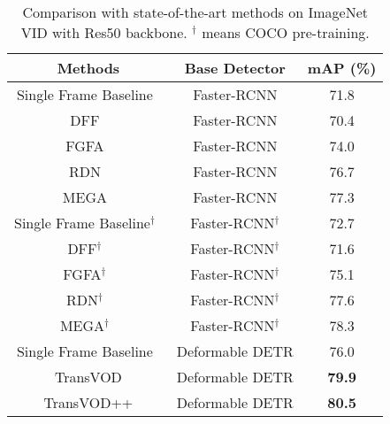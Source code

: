 \documentclass[10pt,journal,compsoc]{IEEEtran}
\begin{document}
\begin{table}[t!]
\caption{
Comparison with state-of-the-art methods on ImageNet VID with Res50 backbone. $^{\dag}$ means COCO pre-training.}
\footnotesize
\vspace{-3mm}
\begin{center}
\begin{tabular}{c|c|c}
\toprule
Methods& Base Detector  & mAP (\%) \\
\midrule
Single Frame Baseline~\cite{ren2016faster} &  Faster-RCNN & 71.8 \\
DFF~\cite{zhu17dff}  & Faster-RCNN &70.4\\
FGFA~\cite{zhu17fgfa}  & Faster-RCNN &74.0\\
RDN~\cite{deng19rdn} &  Faster-RCNN & 76.7\\
MEGA~\cite{chen2020memory}  & Faster-RCNN & 77.3\\
\midrule
Single Frame Baseline$^{\dag}$~\cite{ren2016faster} &  Faster-RCNN$^{\dag}$ & 72.7\\
DFF$^{\dag}$~\cite{zhu17dff}  & Faster-RCNN$^{\dag}$ &71.6\\
FGFA$^{\dag}$~\cite{zhu17fgfa}  & Faster-RCNN$^{\dag}$ &75.1\\
RDN$^{\dag}$~\cite{deng19rdn} &  Faster-RCNN$^{\dag}$ & 77.6\\
MEGA$^{\dag}$~\cite{chen2020memory}  & Faster-RCNN$^{\dag}$ & 78.3\\
\midrule
Single Frame Baseline~\cite{zhu2020deformable}  & Deformable DETR & 76.0 \\
TransVOD &  Deformable DETR  & \textbf{79.9} \\
TransVOD++ &  Deformable DETR  & \textbf{80.5} \\
\bottomrule
\end{tabular}
\end{center}
\label{table:mainresult_r50}
\vspace{-1mm}
\end{table}
\end{document}
